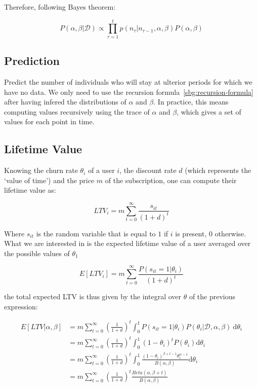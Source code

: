 \documentclass{tufte-book}
\begin{document}
Therefore, following Bayes theorem:

\begin{equation}
  P(\alpha, \beta | \mathcal{D}) \propto \prod_{\tau=1}^t p(n_\tau|n_{\tau-1}, \alpha, \beta) P(\alpha, \beta)
\end{equation}


  \subsection{Prediction}%
  \label{sub:prediction}

Predict the number of individuals who will stay at ulterior periods for which we have no data. We only need to
use the recursion formula~\ref{sbg:recursion-formula} after having infered the distributions of $\alpha$ and
$\beta$. In practice, this means computing values recursively using the trace of $\alpha$ and $\beta$, which
gives a set of values for each point in time.

  
  \subsection{Lifetime Value}%
  \label{sub:lifetime_value}
  
Knowing the churn rate $\theta_i$ of a user $i$, the discount rate $d$ (which represents the `value of
time') and the price $m$ of the subscription, one can compute their lifetime value as:

\begin{equation}
  LTV_i = m \sum_{t=0}^\infty \frac{s_{it}}{\left(1+d\right)^t}
\end{equation}

Where $s_{it}$ is the random variable that is equal to $1$ if $i$ is present, $0$ otherwise. What we are interested in is the expected lifetime value of a user averaged over the possible values of
$\theta_1$

\begin{equation}
  E\left[LTV_i\right] = m \sum_{t=0}^\infty \frac{P(s_{it}=1|\theta_i)}{(1+d)^t}
\end{equation}

the total expected LTV is thus given by the integral over $\theta$ of the previous expression:

\begin{align*}
  E\left[LTV|\alpha, \beta\right] &= m \sum_{t=0}^\infty \left(\frac{1}{1+d}\right)^t \int_0^1 P(s_{it}=1 | \theta_i)
  P(\theta_i|\mathcal{D}, \alpha, \beta)
  \: \mathrm{d} \theta_i\\
  & = m \sum_{t=0}^\infty \left(\frac{1}{1+d}\right)^t \int_0^1 \left(1-\theta_i\right)^t P(\theta_i)
  \mathrm{d}\theta_i\\
  & = m \sum_{t=0}^\infty \left(\frac{1}{1+d}\right)^t \int_0^1 \frac{\left(1-\theta_i\right)^{\beta+t-1}
  \theta_i^{\alpha-1} }{B(\alpha, \beta)}\mathrm{d}\theta_i\\
  & = m \sum_{t=0}^\infty \left(\frac{1}{1+d}\right)^t \frac{Beta(\alpha, \beta+t) }{B(\alpha, \beta)}
\end{align*}
\end{document}
